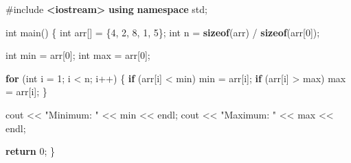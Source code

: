 \documentclass[
]{article}
\newenvironment{Shaded}{}{}
\newcommand{\ControlFlowTok}[1]{\textcolor[rgb]{0.00,0.44,0.13}{\textbf{#1}}}
\newcommand{\DataTypeTok}[1]{\textcolor[rgb]{0.56,0.13,0.00}{#1}}
\newcommand{\DecValTok}[1]{\textcolor[rgb]{0.25,0.63,0.44}{#1}}
\newcommand{\ImportTok}[1]{\textcolor[rgb]{0.00,0.50,0.00}{\textbf{#1}}}
\newcommand{\KeywordTok}[1]{\textcolor[rgb]{0.00,0.44,0.13}{\textbf{#1}}}
\newcommand{\NormalTok}[1]{#1}
\newcommand{\OperatorTok}[1]{\textcolor[rgb]{0.40,0.40,0.40}{#1}}
\newcommand{\PreprocessorTok}[1]{\textcolor[rgb]{0.74,0.48,0.00}{#1}}
\newcommand{\StringTok}[1]{\textcolor[rgb]{0.25,0.44,0.63}{#1}}
\begin{document}
\begin{Shaded}
\begin{Highlighting}[]
\PreprocessorTok{\#include }\ImportTok{\textless{}iostream\textgreater{}}
\KeywordTok{using} \KeywordTok{namespace}\NormalTok{ std}\OperatorTok{;}

\DataTypeTok{int}\NormalTok{ main}\OperatorTok{()} \OperatorTok{\{}
    \DataTypeTok{int}\NormalTok{ arr}\OperatorTok{[]} \OperatorTok{=} \OperatorTok{\{}\DecValTok{4}\OperatorTok{,} \DecValTok{2}\OperatorTok{,} \DecValTok{8}\OperatorTok{,} \DecValTok{1}\OperatorTok{,} \DecValTok{5}\OperatorTok{\};}
    \DataTypeTok{int}\NormalTok{ n }\OperatorTok{=} \KeywordTok{sizeof}\OperatorTok{(}\NormalTok{arr}\OperatorTok{)} \OperatorTok{/} \KeywordTok{sizeof}\OperatorTok{(}\NormalTok{arr}\OperatorTok{[}\DecValTok{0}\OperatorTok{]);}

    \DataTypeTok{int}\NormalTok{ min }\OperatorTok{=}\NormalTok{ arr}\OperatorTok{[}\DecValTok{0}\OperatorTok{];}
    \DataTypeTok{int}\NormalTok{ max }\OperatorTok{=}\NormalTok{ arr}\OperatorTok{[}\DecValTok{0}\OperatorTok{];}

    \ControlFlowTok{for} \OperatorTok{(}\DataTypeTok{int}\NormalTok{ i }\OperatorTok{=} \DecValTok{1}\OperatorTok{;}\NormalTok{ i }\OperatorTok{\textless{}}\NormalTok{ n}\OperatorTok{;}\NormalTok{ i}\OperatorTok{++)} \OperatorTok{\{}
        \ControlFlowTok{if} \OperatorTok{(}\NormalTok{arr}\OperatorTok{[}\NormalTok{i}\OperatorTok{]} \OperatorTok{\textless{}}\NormalTok{ min}\OperatorTok{)}
\NormalTok{            min }\OperatorTok{=}\NormalTok{ arr}\OperatorTok{[}\NormalTok{i}\OperatorTok{];}
        \ControlFlowTok{if} \OperatorTok{(}\NormalTok{arr}\OperatorTok{[}\NormalTok{i}\OperatorTok{]} \OperatorTok{\textgreater{}}\NormalTok{ max}\OperatorTok{)}
\NormalTok{            max }\OperatorTok{=}\NormalTok{ arr}\OperatorTok{[}\NormalTok{i}\OperatorTok{];}
    \OperatorTok{\}}

\NormalTok{    cout }\OperatorTok{\textless{}\textless{}} \StringTok{"Minimum: "} \OperatorTok{\textless{}\textless{}}\NormalTok{ min }\OperatorTok{\textless{}\textless{}}\NormalTok{ endl}\OperatorTok{;}
\NormalTok{    cout }\OperatorTok{\textless{}\textless{}} \StringTok{"Maximum: "} \OperatorTok{\textless{}\textless{}}\NormalTok{ max }\OperatorTok{\textless{}\textless{}}\NormalTok{ endl}\OperatorTok{;}

    \ControlFlowTok{return} \DecValTok{0}\OperatorTok{;}
\OperatorTok{\}}
\end{Highlighting}
\end{Shaded}
\end{document}
